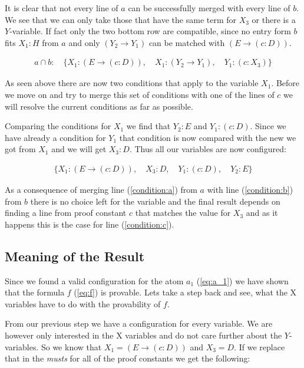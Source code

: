 It is clear that not every line of $a$ can be successfully merged with every line of $b$. We see that we can only take those that have the same term for $X_3$ or there is a $Y$-variable. If fact only the two bottom row are compatible, since no entry form $b$ fits $X_1: H$ from $a$ and only $(Y_2 \rightarrow Y_1)$ can be matched with $(E \rightarrow (c:D))$.

\begin{align}
	a \cap b: \quad \{X_1: (E \rightarrow (c:D)), \quad X_1: (Y_2 \rightarrow Y_1), \quad Y_1: (c:X_3)\}
\end{align}

As seen above there are now two conditions that apply to the variable $X_1$. Before we move on and try to merge this set of conditions with one of the lines of $c$ we will resolve the current conditions as far as possible.

Comparing the conditions for $X_1$ we find that $Y_2: E$ and $Y_1: (c:D)$. Since we have already a condition for $Y_1$ that condition is now compared with the new we got from $X_1$ and we will get $X_3: D$. Thus all our variables are now configured:

\begin{align}
	\{X_1: (E \rightarrow (c:D)), \quad X_3: D, \quad Y_1: (c:D), \quad Y_2: E\}
\end{align}

As a consequence of merging line (\ref{condition:a}) from $a$ with line (\ref{condition:b}) from $b$ there is no choice left for the variable and the final result depends on finding a line from proof constant $c$ that matches the value for $X_3$ and as it happens this is the case for line (\ref{condition:c}).


\subsection{Meaning of the Result}
Since we found a valid configuration for the atom $a_1$ (\ref{eq:a_1}) we have shown that the formula $f$ (\ref{eq:f}) is provable. Lets take a step back and see, what the X variables have to do with the provability of $f$.

From our previous step we have a configuration for every variable. We are however only interested in the X variables and do not care further about the $Y$-variables. So we know that $X_1 = (E \rightarrow (c:D))$ and $X_3 = D$. If we replace that in the \emph{musts} for all of the proof constants we get the following:

